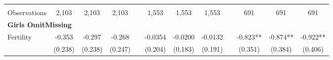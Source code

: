 \begin{landscape}
\begin{table}[htpb!]
\begin{center}
\begin{tabular}{lcccp{2mm}cccp{2mm}ccc}
\begin{footnotesize}\end{footnotesize}&\begin{footnotesize}\end{footnotesize}&\begin{footnotesize}\end{footnotesize}&\begin{footnotesize}\end{footnotesize}&\begin{footnotesize}\end{footnotesize}&\begin{footnotesize}\end{footnotesize}&\begin{footnotesize}\end{footnotesize}&\begin{footnotesize}\end{footnotesize}&\begin{footnotesize}\end{footnotesize}&\begin{footnotesize}\end{footnotesize}&\begin{footnotesize}\end{footnotesize}&\begin{footnotesize}\end{footnotesize}\\Observations&2,103&2,103&2,103&&1,553&1,553&1,553&&691&691&691\\
\multicolumn{12}{l}{\textbf{Girls OmitMissing}}\\ 
Fertility&-0.353&-0.297&-0.268&&-0.0354&-0.0200&-0.0132&&-0.823**&-0.874**&-0.922**\\
&(0.238)&(0.238)&(0.247)&&(0.204)&(0.183)&(0.191)&&(0.351)&(0.384)&(0.406)\\

\end{tabular}
\end{center}
\end{table}
\end{landscape}
